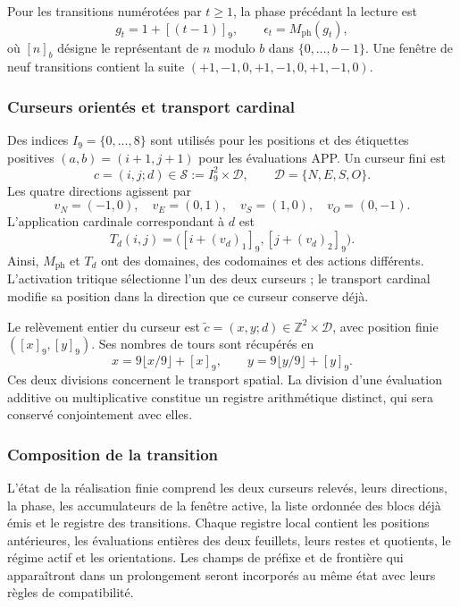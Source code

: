 Pour les transitions numérotées par \(t\geq1\), la phase précédant la lecture est
\begin{equation}
 g_t=1+[(t-1)]_9,\qquad \epsilon_t=M_{\mathrm{ph}}(g_t),
 \label{act21:tpk:fase}
\end{equation}
où \([n]_b\) désigne le représentant de \(n\) modulo \(b\) dans
\(\{0,\ldots,b-1\}\). Une fenêtre de neuf transitions contient la suite
\((+1,-1,0,+1,-1,0,+1,-1,0)\).

\subsubsection{Curseurs orientés et transport cardinal}

Des indices \(I_9=\{0,\ldots,8\}\) sont utilisés pour les positions et des étiquettes positives \((a,b)=(i+1,j+1)\) pour les évaluations APP. Un curseur fini est
\[
 c=(i,j;d)\in\mathcal S:=I_9^2\times\mathcal D,
 \qquad \mathcal D=\{N,E,S,O\}.
\]
Les quatre directions agissent par
\[
 v_N=(-1,0),\quad v_E=(0,1),\quad
 v_S=(1,0),\quad v_O=(0,-1).
\]
L'application cardinale correspondant à \(d\) est
\[
 T_d(i,j)=\bigl([i+(v_d)_1]_9,[j+(v_d)_2]_9\bigr).
\]
Ainsi, \(M_{\mathrm{ph}}\) et \(T_d\) ont des domaines, des codomaines et des actions différents. L'activation tritique sélectionne l'un des deux curseurs ; le transport cardinal modifie sa position dans la direction que ce curseur conserve déjà.

Le relèvement entier du curseur est
\(\widetilde c=(x,y;d)\in\mathbb Z^2\times\mathcal D\), avec position finie
\(([x]_9,[y]_9)\). Ses nombres de tours sont récupérés en
\begin{equation}
 x=9\lfloor x/9\rfloor+[x]_9,\qquad
 y=9\lfloor y/9\rfloor+[y]_9.
 \label{act21:tpk:vueltas}
\end{equation}
Ces deux divisions concernent le transport spatial. La division d'une
évaluation additive ou multiplicative constitue un registre arithmétique
distinct, qui sera conservé conjointement avec elles.

\subsubsection{Composition de la transition}

L'état de la réalisation finie comprend les deux curseurs relevés,
leurs directions, la phase, les accumulateurs de la fenêtre active, la liste
ordonnée des blocs déjà émis et le registre des transitions. Chaque registre
local contient les positions antérieures, les évaluations entières des deux
feuillets, leurs restes et quotients, le régime actif et les orientations.
Les champs de préfixe et de frontière qui apparaîtront dans un prolongement seront
incorporés au même état avec leurs règles de compatibilité.

